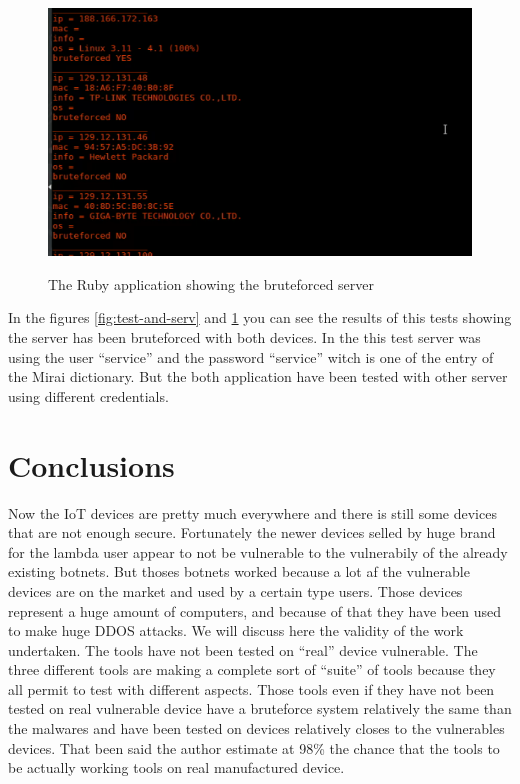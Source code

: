 \documentclass{report}
\begin{document}
\begin{figure}[h]
 \caption{The Ruby application showing the bruteforced server}
 \centering
 \includegraphics[width=1.2\textwidth]{./img/exp/screen-test-ruby}
 \label{fig:test-ruby-serv}
\end{figure}
In the figures \ref{fig:test-and-serv} and \ref{fig:test-ruby-serv} you can see the results of this tests showing the server has been bruteforced with both devices. In the this test server was using the user ``service'' and the password ``service'' witch is one of the entry of the Mirai dictionary. But the both application have been tested with other server using different credentials. 


\chapter{Conclusions}
Now the IoT devices are pretty much everywhere and there is still some devices that are not enough secure. Fortunately the newer devices selled by huge brand for the lambda user appear to not be vulnerable to the vulnerabily of the already existing botnets. But thoses botnets worked because a lot af the vulnerable devices are on the market and used by a certain type users. Those devices represent a huge amount of computers, and because of that they have been used to make huge DDOS attacks. We will discuss here the validity of the work undertaken.\newline
The tools have not been tested on ``real'' device vulnerable.\newline
The three different tools are making a complete sort of ``suite'' of tools because they all permit to test with different aspects.\newline
Those tools even if they have not been tested on real vulnerable device have a bruteforce system relatively the same than the malwares and have been tested on devices relatively closes to the vulnerables devices. That been said the author estimate at 98\% the chance that the tools to be actually working tools on real manufactured device.
\end{document}
